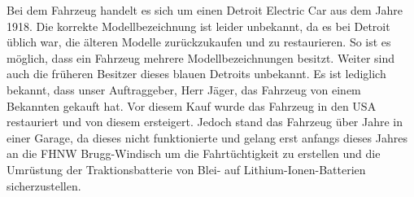 Bei dem Fahrzeug handelt es sich um einen Detroit Electric Car aus dem Jahre 1918. Die korrekte Modellbezeichnung ist leider unbekannt, da es bei Detroit üblich war, die älteren Modelle zurückzukaufen und zu restaurieren. So ist es möglich, dass ein Fahrzeug mehrere Modellbezeichnungen besitzt. Weiter sind auch die früheren Besitzer dieses blauen Detroits unbekannt. Es ist lediglich bekannt, dass unser Auftraggeber, Herr Jäger, das Fahrzeug von einem Bekannten gekauft hat. Vor diesem Kauf wurde das Fahrzeug in den USA restauriert und von diesem ersteigert. Jedoch stand das Fahrzeug über Jahre in einer Garage, da dieses nicht funktionierte und gelang erst anfangs dieses Jahres an die FHNW Brugg-Windisch um die Fahrtüchtigkeit zu erstellen und die Umrüstung der Traktionsbatterie von Blei- auf Lithium-Ionen-Batterien sicherzustellen.

\newpage
